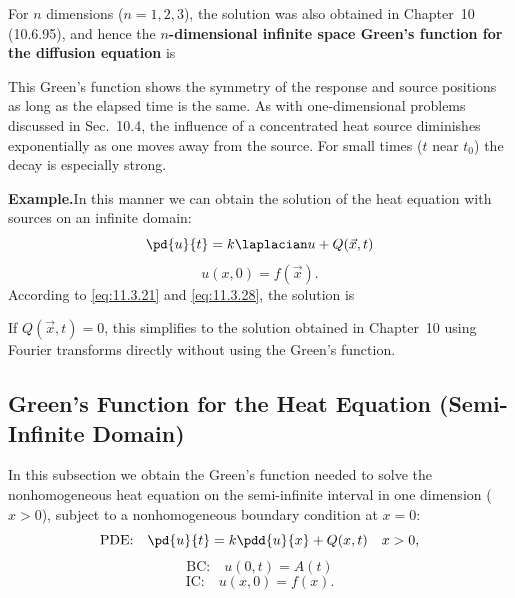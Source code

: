 For $n$ dimensions ($n = 1,2,3$), the solution was also obtained in Chapter~10 (10.6.95), and hence the \textbf{$n$-dimensional infinite space Green's function for the diffusion equation} is

This Green's function shows the symmetry of the response and source positions as long as the elapsed time is the same.  As with one-dimensional problems discussed in Sec.~10.4, the influence of a concentrated heat source diminishes exponentially as one moves away from the source.  For small times ($t$ near $t_0$) the decay is especially strong.

\textbf{Example.}\quad In this manner we can obtain the solution of the heat equation with sources on an infinite domain:
\begin{equation}
\label{eq:11.3.29}
\pd{u}{t} = k\laplacian u + Q(\vec{x},t)
\end{equation}
\[
u(x,0) = f(\vec{x}).
\]
According to \eqref{eq:11.3.21} and \eqref{eq:11.3.28}, the solution is

If $Q(\vec{x},t) = 0$, this simplifies to the solution obtained in Chapter~10 using Fourier transforms directly without using the Green's function.

\subsection{Green's Function for the Heat Equation (Semi-Infinite Domain)}
\label{subsec:semi-inf-greens-heat}

In this subsection we obtain the Green's function needed to solve the nonhomogeneous heat equation on the semi-infinite interval in one dimension ($x > 0$), subject to a nonhomogeneous boundary condition at $x = 0$:
\begin{equation}
\label{eq:11.3.31}
\text{PDE:}\quad \pd{u}{t} = k\pdd{u}{x} + Q(x,t) \quad x > 0,
\end{equation}
\begin{equation}
\label{eq:11.3.32}
\text{BC:}\quad u(0,t) = A(t)
\end{equation}
\begin{equation}
\label{eq:11.3.33}
\text{IC:}\quad u(x,0) = f(x).
\end{equation}

